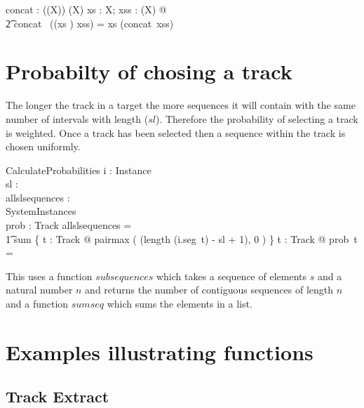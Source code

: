 \documentclass[11pt]{article}
\begin{document}
\begin{gendef}[X]
 	concat : (\seq (\seq X)) \fun (\seq X)
\where 
	\forall xs : \seq X; xss : \seq (\seq X) @ \\
\t2		concat~ ((\langle xs \rangle) \cat xss) = xs \cat
(concat~xss)  
\end{gendef}

\section{Probabilty of chosing a track} 

The longer the track in a target the more sequences it will contain with the same number of intervals with length ($sl$). Therefore the probability of selecting a track is weighted. Once a track has been selected then a sequence within the track is chosen uniformly. 



\begin{schema}{CalculateProbabilities}
	i : Instance \\
	sl : \nat  \\
	allslsequences : \nat \\
	SystemInstances \\
	prob : Track \fun \R  \also
\where
	allslsequences = \\
\t1 		sum \{ t : Track @ pairmax ( 	(length (i.seg~t) - sl + 1), 0 ) \}  \also
 	\forall t : Track @  	prob~t =  
\end{schema}

This uses a function $subsequences$ which takes a sequence of elements $s$ and a natural number $n$ and returns the number of contiguous sequences of length $n$  and a function $sumseq$ which sums the elements in a list. 

\section{Examples illustrating functions}

\subsection{Track Extract}
\end{document}
